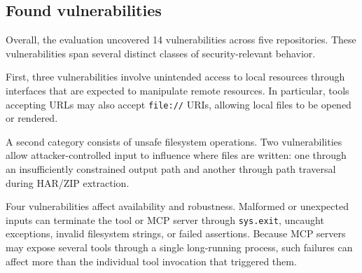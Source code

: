 

\subsection{Found vulnerabilities}
\label{sec:eval-vulns}

Overall, the evaluation uncovered 14 vulnerabilities across five
repositories. These vulnerabilities span several distinct classes of
security-relevant behavior.



First, three vulnerabilities involve unintended access to local resources
through interfaces that are expected to manipulate remote resources. In
particular, tools accepting URLs may also accept \texttt{file://} URIs,
allowing local files to be opened or rendered.

A second category consists of unsafe filesystem operations. Two
vulnerabilities allow attacker-controlled input to influence where files
are written: one through an insufficiently constrained output path and
another through path traversal during HAR/ZIP extraction.

Four vulnerabilities affect availability and robustness. Malformed or
unexpected inputs can terminate the tool or MCP server through
\texttt{sys.exit}, uncaught exceptions, invalid filesystem strings, or
failed assertions. Because MCP servers may expose several tools through a
single long-running process, such failures can affect more than the
individual tool invocation that triggered them.

